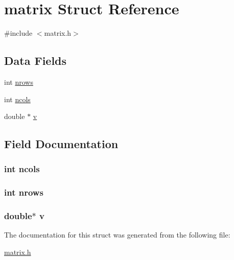 \hypertarget{structmatrix}{}\section{matrix Struct Reference}
\label{structmatrix}


{\ttfamily \#include $<$matrix.\+h$>$}

\subsection*{Data Fields}
\begin{DoxyCompactItemize}
\item 
int \hyperlink{structmatrix_a53e53380c64d2dcc85486da7f90794d5}{nrows}
\item 
int \hyperlink{structmatrix_a7c4b990ebe8d2c098f3974f6ffe0c9b4}{ncols}
\item 
double $\ast$ \hyperlink{structmatrix_a18edff6f6f8cc7071adfd9bc826378ef}{v}
\end{DoxyCompactItemize}


\subsection{Field Documentation}
\subsubsection[{\texorpdfstring{ncols}{ncols}}]{\setlength{\rightskip}{0pt plus 5cm}int ncols}\hypertarget{structmatrix_a7c4b990ebe8d2c098f3974f6ffe0c9b4}{}\label{structmatrix_a7c4b990ebe8d2c098f3974f6ffe0c9b4}
\subsubsection[{\texorpdfstring{nrows}{nrows}}]{\setlength{\rightskip}{0pt plus 5cm}int nrows}\hypertarget{structmatrix_a53e53380c64d2dcc85486da7f90794d5}{}\label{structmatrix_a53e53380c64d2dcc85486da7f90794d5}
\subsubsection[{\texorpdfstring{v}{v}}]{\setlength{\rightskip}{0pt plus 5cm}double$\ast$ v}\hypertarget{structmatrix_a18edff6f6f8cc7071adfd9bc826378ef}{}\label{structmatrix_a18edff6f6f8cc7071adfd9bc826378ef}


The documentation for this struct was generated from the following file\+:\begin{DoxyCompactItemize}
\item 
\hyperlink{matrix_8h}{matrix.\+h}\end{DoxyCompactItemize}
